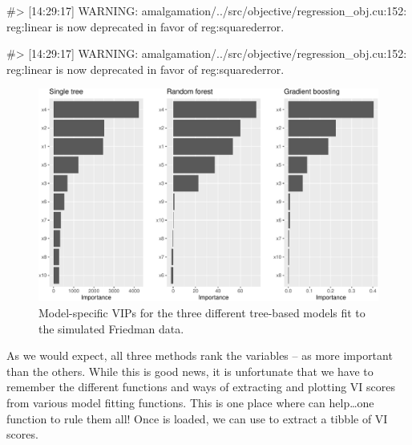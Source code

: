 \begin{Schunk}
\begin{Soutput}
#> [14:29:17] WARNING: amalgamation/../src/objective/regression_obj.cu:152: reg:linear is now deprecated in favor of reg:squarederror.
\end{Soutput}
\begin{Soutput}
#> [14:29:17] WARNING: amalgamation/../src/objective/regression_obj.cu:152: reg:linear is now deprecated in favor of reg:squarederror.
\end{Soutput}
\begin{figure}[!htb]

{\centering \includegraphics[width=1\linewidth]{greenwell-boehmke_files/figure-latex/vi-plots-1} 

}

\caption[Model-specific VIPs for the three different tree-based models fit to the simulated Friedman data]{Model-specific VIPs for the three different tree-based models fit to the simulated Friedman data.}\label{fig:vi-plots}
\end{figure}
\end{Schunk}

As we would expect, all three methods rank the variables
-- as more important than the others. While this is
good news, it is unfortunate that we have to remember the different
functions and ways of extracting and plotting VI scores from various
model fitting functions. This is one place where  can
help\ldots{}one function to rule them all! Once  is loaded, we
can use  to extract a tibble of VI scores.

